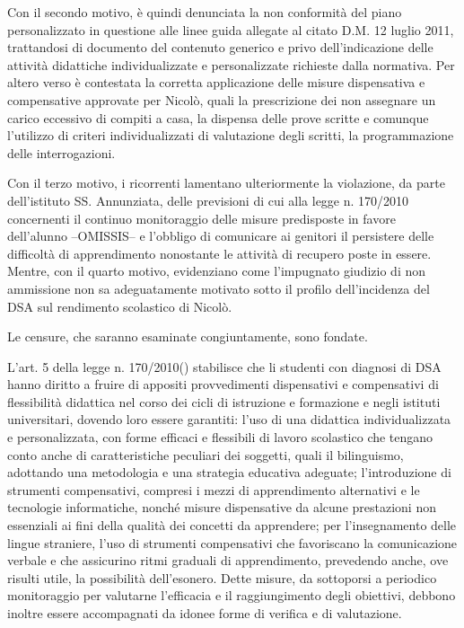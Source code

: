 Con il secondo motivo, è quindi denunciata la non conformità del piano personalizzato in questione alle linee guida allegate al citato D.M. 12 luglio 2011, trattandosi di documento del contenuto generico e privo dell'indicazione delle attività didattiche individualizzate e personalizzate richieste dalla normativa. Per altero verso è contestata la corretta applicazione delle misure dispensativa e compensative approvate per Nicolò, quali la prescrizione dei non assegnare un carico eccessivo di compiti a casa, la dispensa delle prove scritte e comunque l'utilizzo di criteri individualizzati di valutazione degli scritti, la programmazione delle interrogazioni.

Con il terzo motivo, i ricorrenti lamentano ulteriormente la violazione, da parte dell'istituto SS. Annunziata, delle previsioni di cui alla legge n. 170/2010 concernenti il continuo monitoraggio delle misure predisposte in favore dell'alunno --OMISSIS-- e l'obbligo di comunicare ai genitori il persistere delle difficoltà di apprendimento nonostante le attività di recupero poste in essere. Mentre, con il quarto motivo, evidenziano come l'impugnato giudizio di non ammissione non sa adeguatamente motivato sotto il profilo dell'incidenza del DSA sul rendimento scolastico di Nicolò.

Le censure, che saranno esaminate congiuntamente, sono fondate.

L'art. 5 della legge n. 170/2010() stabilisce che li studenti con diagnosi di DSA hanno diritto a fruire di appositi provvedimenti dispensativi e compensativi di flessibilità didattica nel corso dei cicli di istruzione e formazione e negli istituti universitari, dovendo loro essere garantiti: l'uso di una didattica individualizzata e personalizzata, con forme efficaci e flessibili di lavoro scolastico che tengano conto anche di caratteristiche peculiari dei soggetti, quali il bilinguismo, adottando una metodologia e una strategia educativa adeguate; l'introduzione di strumenti compensativi, compresi i mezzi di apprendimento alternativi e le tecnologie informatiche, nonché misure dispensative da alcune prestazioni non essenziali ai fini della qualità dei concetti da apprendere; per l'insegnamento delle lingue straniere, l'uso di strumenti compensativi che favoriscano la comunicazione verbale e che assicurino ritmi graduali di apprendimento, prevedendo anche, ove risulti utile, la possibilità dell'esonero. Dette misure, da sottoporsi a periodico monitoraggio per valutarne l'efficacia e il raggiungimento degli obiettivi, debbono inoltre essere accompagnati da idonee forme di verifica e di valutazione.
 
